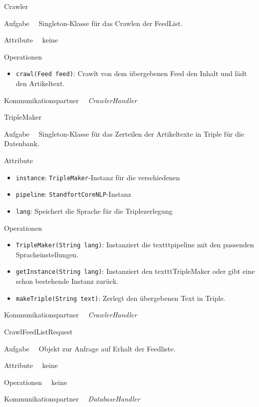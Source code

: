 \begin{class}{40}{Crawler}
\item[Aufgabe]~\
Singleton-Klasse für das Crawlen der FeedList.
\item[Attribute]~\
keine
\item[Operationen]~\
\begin{itemize}
    \item \texttt{crawl(Feed feed)}: Crawlt von dem übergebenen Feed den Inhalt
    und lädt den Artikeltext.
\end{itemize}
\item[Kommunikationspartner]~\
\textit{CrawlerHandler}
\end{class}

\begin{class}{40}{TripleMaker}
\item[Aufgabe]~\
Singleton-Klasse für das Zerteilen der Artikeltexte in Triple für die Datenbank.
\item[Attribute]~\
\begin{itemize}
  \item \texttt{instance}: \texttt{TripleMaker}-Instanz für die verschiedenen 
  \item \texttt{pipeline}: \texttt{StandfortCoreNLP}-Instanz
  \item \texttt{lang}: Speichert die Sprache für die Triplezerlegung
\end{itemize}
\item[Operationen]~\
\begin{itemize}
    \item \texttt{TripleMaker(String lang)}: Instanziert die texttt{pipeline}
    mit den passenden Spracheinstellungen.
    \item \texttt{getInstance(String lang)}: Instanziert den texttt{TripleMaker}
    oder gibt eine schon bestehende Instanz zurück.
    \item \texttt{makeTriple(String text)}: Zerlegt den übergebenen Text in
    Triple.
\end{itemize}
\item[Kommunikationspartner]~\
\textit{CrawlerHandler}
\end{class}

\begin{class}{40}{CrawlFeedListRequest}
\item[Aufgabe]~\
Objekt zur Anfrage auf Erhalt der Feedliste.
\item[Attribute]~\
keine
\item[Operationen]~\
keine
\item[Kommunikationspartner]~\
\textit{DatabaseHandler}
\end{class}

